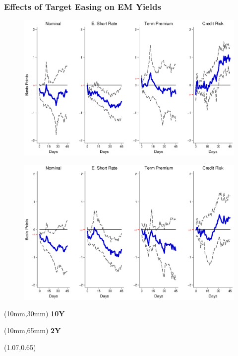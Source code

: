 \documentclass[12pt, aspectratio=169, xcolor=dvipsnames]{beamer}
\begin{document}
\begin{frame}[label=TargetEM]
\frametitle{Effects of Target Easing on EM Yields}
\begin{figure}[!htbp]
\begin{center} %
\includegraphics[trim={0cm 0cm 0cm 0cm},clip,height=0.45\textheight,width=0.85\linewidth]{../Figures/LPs/LagDep-FX/Target/EM/TargetEMnomyptpphi120m.eps}
\par\end{center}
\end{figure}
\vspace{-0.5cm}
\begin{figure}[!htbp]
\begin{center} %
\includegraphics[trim={0cm 0cm 0cm 0.76cm},clip,height=0.45\textheight,width=0.85\linewidth]{../Figures/LPs/LagDep-FX/Target/EM/TargetEMnomyptpphi24m.eps}
\par\end{center}
\end{figure}
\begin{textblock*}{8mm}(10mm,30mm)
\small \textbf{10Y}
\end{textblock*}
\begin{textblock*}{8mm}(10mm,65mm)
\small \textbf{2Y}
\end{textblock*}
\begin{textblock*}{5cm}(1.07\textwidth,0.65\textheight)
\hyperlink{TargetUS}{}
\end{textblock*}
\end{frame}
\end{document}
